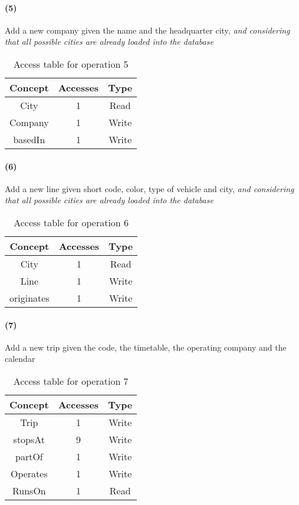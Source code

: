 	\newpage
	\paragraph{(5)} Add a new company given the name and the headquarter city, \textit{and considering that all possible cities are already loaded into the database}
	
	\begin{table}[h]
		\centering
		\begin{tabular}{|c|c|c|}
			\hline
			\textbf{Concept} & \textbf{Accesses} & \textbf{Type} \\
			\hline
			City & 1 & Read \\ \hline
			Company & 1 & Write \\ \hline 
			basedIn & 1 & Write \\ \hline
		\end{tabular}
		\caption{Access table for operation 5}\label{tbl:conc.access-5}
	\end{table}
	
	\paragraph{(6)} Add a new line given short code, color, type of vehicle and city, \textit{and considering that all possible cities are already loaded into the database}
	\begin{table}[h]
		\centering
		\begin{tabular}{|c|c|c|}
			\hline
			\textbf{Concept} & \textbf{Accesses} & \textbf{Type} \\
			\hline
			City & 1 & Read \\ \hline
			Line & 1 & Write \\ \hline
			originates & 1 & Write \\ \hline
		\end{tabular}
		\caption{Access table for operation 6}\label{tbl:conc.access-6}
	\end{table}
	
	\paragraph{(7)} Add a new trip given the code, the timetable, the operating company and the calendar
	\begin{table}[h]
		\centering
		\begin{tabular}{|c|c|c|}
			\hline
			\textbf{Concept} & \textbf{Accesses} & \textbf{Type} \\
			\hline
			Trip & 1 & Write \\ \hline
			stopsAt & 9 & Write \\ \hline
			partOf & 1 & Write \\ \hline
			Operates & 1 & Write \\ \hline
			RunsOn & 1 & Read \\ \hline
		\end{tabular}
		\caption{Access table for operation 7}\label{tbl:conc.access-7}
	\end{table}
	
